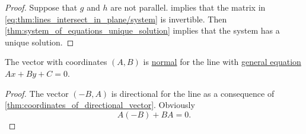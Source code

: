 \begin{proof}
  \UniquenessSubProof Suppose that \( g \) and \( h \) are not parallel.  implies that the matrix in \eqref{eq:thm:lines_intersect_in_plane/system} is invertible. Then \cref{thm:system_of_equations_unique_solution} implies that the system has a unique solution.
\end{proof}

\begin{proposition}\label{thm:normal_vector_of_line}
  The vector with coordinates \( (A, B) \) is \hyperref[def:normal_vector]{normal} for the line with \hyperref[def:plane_line_equations/general]{general equation} \( A x + B y + C = 0 \).
\end{proposition}
\begin{proof}
  The vector \( (-B, A) \) is directional for the line as a consequence of \cref{thm:coordinates_of_directional_vector}. Obviously
  \begin{equation*}
    A(-B) + BA = 0.
  \end{equation*}
\end{proof}

